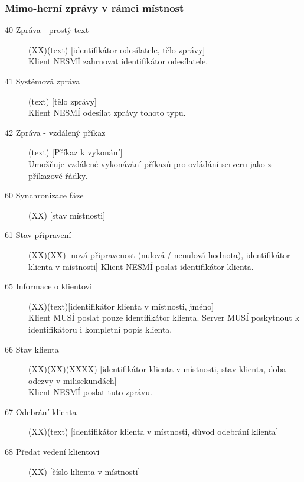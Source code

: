 \documentclass[12pt,a4paper]{article}
\begin{document}
\subsubsection*{Mimo-herní zprávy v rámci místnost}
\begin{description}
\item[40 Zpráva - prostý text](XX)(text) [identifikátor odesílatele, tělo zprávy] \\
Klient NESMÍ zahrnovat identifikátor odesílatele.
\item[41 Systémová zpráva](text) [tělo zprávy] \\
Klient NESMÍ odesílat zprávy tohoto typu.
\item[42 Zpráva - vzdálený příkaz](text) [Příkaz k vykonání] \\
Umožňuje vzdálené vykonávání příkazů pro ovládání serveru jako z příkazové řádky.

\item[60 Synchronizace fáze] (XX) [stav místnosti]

\item[61 Stav připravení] (XX)(XX) [nová připravenost (nulová / nenulová hodnota), identifikátor klienta v místnosti]
Klient NESMÍ poslat identifikátor klienta.

\item[65 Informace o klientovi] (XX)(text)[identifikátor klienta v místnosti, jméno] \\
Klient MUSÍ poslat pouze identifikátor klienta. Server MUSÍ poskytnout k identifikátoru i kompletní popis klienta.

\item[66 Stav klienta] (XX)(XX)(XXXX) [identifikátor klienta v místnosti, stav klienta, doba odezvy v milisekundách] \\
Klient NESMÍ poslat tuto zprávu.

\item[67 Odebrání klienta] (XX)(text) [identifikátor klienta v místnosti, důvod odebrání klienta]

\item[68 Předat vedení klientovi] (XX) [číslo klienta v místnosti]
\end{description}
\end{document}
